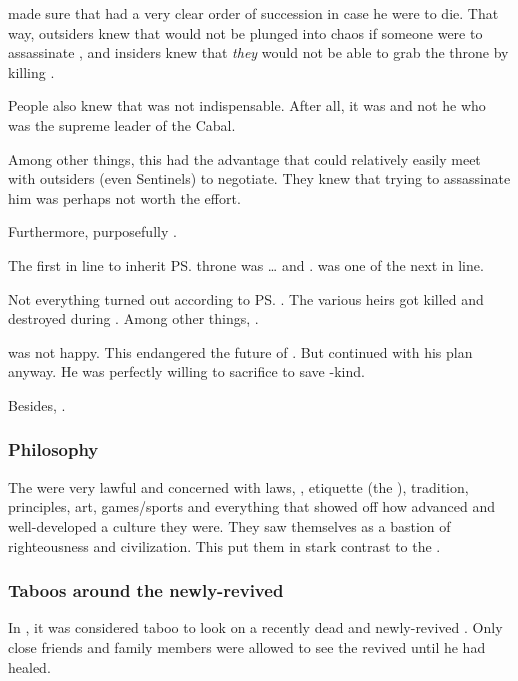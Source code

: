  made sure that \CiriathSepher{} had a very clear order of succession in case he were to die. 
That way, outsiders knew that \CiriathSepher{} would not be plunged into chaos if someone were to assassinate \Azraid, and insiders knew that \emph{they} would not be able to grab the throne by killing \Azraid. 

People also knew that \Azraid{} was not indispensable. 
After all, it was  and not he who was the supreme leader of the Cabal. 

Among other things, this had the advantage that \Azraid{} could relatively easily meet with outsiders (even Sentinels) to negotiate. 
They knew that trying to assassinate him was perhaps not worth the effort. 

Furthermore, {\Azraid} purposefully . 

The first in line to inherit \ps{\Azraid} throne was \ldots{} and . 
 was one of the next in line. 

Not everything turned out according to \ps{\Azraid} . 
The various heirs got killed and destroyed during \SentinelsofMithEmph. 
Among other things, . 

\Azraid{} was not happy. 
This endangered the future of \CiriathSepher. 
But \Azraid{} continued with his plan anyway. 
He was perfectly willing to sacrifice \CiriathSepher{} to save \resphan-kind. 

Besides, . 





\subsubsection{Philosophy}
The \KiriathSepher{} were very lawful and concerned with laws, \honour, etiquette (the ), tradition, principles, art, games/sports and everything that showed off how advanced and well-developed a culture they were. 
They saw themselves as a bastion of righteousness and civilization. 
This put them in stark contrast to the \Mystraacht. 





\subsubsection{Taboos around the newly-revived}
In \CiriathSepher, it was considered taboo to look on a recently dead and newly-revived \resphan.
Only close friends and family members were allowed to see the revived until he had healed. 

